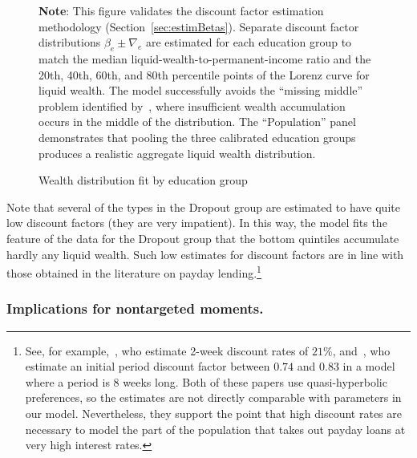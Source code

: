 \documentclass[qe,draft]{econsocart}
\theoremstyle{plain}
\theoremstyle{definition}
\begin{document}
\begin{figure}[htb] %
  \centering
  \caption{\pregenmark Wealth distribution fit by education group}
  \label{fig:LorenzPts} %

  \medskip
  \noindent\parbox{\textwidth}{\footnotesize
    \textbf{Note}: This figure validates the discount factor estimation methodology (Section~\ref{sec:estimBetas}).
    Separate discount factor distributions $\beta_e \pm \nabla_e$ are estimated for each education group
    to match the median liquid-wealth-to-permanent-income ratio and the 20th, 40th, 60th, and 80th
    percentile points of the Lorenz curve for liquid wealth.
    The model successfully avoids the ``missing middle'' problem identified by~\cite{kaplanMPC2022},
    where insufficient wealth accumulation occurs in the middle of the distribution.
    The ``Population'' panel demonstrates that pooling the three calibrated education groups
    produces a realistic aggregate liquid wealth distribution.
  }
\end{figure}

\vspace{0.5em}


Note that several of the types in the Dropout group are estimated to have quite low discount factors (they are very impatient).
In this way, the model fits the feature of the data for the Dropout group that the bottom quintiles accumulate hardly any liquid wealth.
Such low estimates for discount factors are in line with those obtained in the literature on payday lending.\footnote{See, for example,~\cite{skiba2008payday}, who estimate 2-week discount rates of $21\%$, and~\cite{allcott2022high}, who estimate an initial period discount factor between $0.74$ and $0.83$ in a model where a period is 8 weeks long.
  Both of these papers use quasi-hyperbolic preferences, so the estimates are not directly comparable with parameters in our model.
  Nevertheless, they support the point that high discount rates are necessary to model the part of the population that takes out payday loans at very high interest rates.}

\subsubsection{Implications for nontargeted moments.}\label{nontargeted-moments}
\label{sec:nonTargetedMoments}
\end{document}
